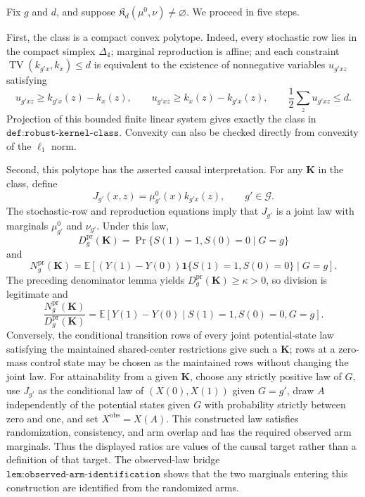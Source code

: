 Fix \(g\) and \(d\), and suppose \(\mathfrak K_d(\mu^0,\nu)\ne\varnothing\).  We proceed in five steps.

First, the class is a compact convex polytope.  Indeed, every stochastic row lies in the compact simplex \(\Delta_4\); marginal reproduction is affine; and each constraint
\(\operatorname{TV}(k_{g'x},k_x)\le d\) is equivalent to the existence of nonnegative variables \(u_{g'xz}\) satisfying
\[
 u_{g'xz}\ge k_{g'x}(z)-k_x(z),\qquad
 u_{g'xz}\ge k_x(z)-k_{g'x}(z),\qquad
 \frac12\sum_z u_{g'xz}\le d.
\]
Projection of this bounded finite linear system gives exactly the class in \(\texttt{def:robust-kernel-class}\).  Convexity can also be checked directly from convexity of the \(\ell_1\) norm.

Second, this polytope has the asserted causal interpretation.  For any \(\mathbf K\) in the class, define
\[
 J_{g'}(x,z)=\mu_{g'}^0(x)k_{g'x}(z),\qquad g'\in\mathcal G.
\]
The stochastic-row and reproduction equations imply that \(J_{g'}\) is a joint law with marginals \(\mu_{g'}^0\) and \(\nu_{g'}\).  Under this law,
\[
 D_g^{\mathrm{pr}}(\mathbf K)
 =\Pr\{S(1)=1,S(0)=0\mid G=g\}
\]
and
\[
 N_g^{\mathrm{pr}}(\mathbf K)
 =\mathbb E[(Y(1)-Y(0))\mathbf 1\{S(1)=1,S(0)=0\}\mid G=g].
\]
The preceding denominator lemma yields \(D_g^{\mathrm{pr}}(\mathbf K)\ge\kappa>0\), so division is legitimate and
\[
 \frac{N_g^{\mathrm{pr}}(\mathbf K)}{D_g^{\mathrm{pr}}(\mathbf K)}
 =\mathbb E[Y(1)-Y(0)\mid S(1)=1,S(0)=0,G=g].
\]
Conversely, the conditional transition rows of every joint potential-state law satisfying the maintained shared-center restrictions give such a \(\mathbf K\); rows at a zero-mass control state may be chosen as the maintained rows without changing the joint law.  For attainability from a given \(\mathbf K\), choose any strictly positive law of \(G\), use \(J_{g'}\) as the conditional law of \((X(0),X(1))\) given \(G=g'\), draw \(A\) independently of the potential states given \(G\) with probability strictly between zero and one, and set \(X^{\mathrm{obs}}=X(A)\).  This constructed law satisfies randomization, consistency, and arm overlap and has the required observed arm marginals.  Thus the displayed ratios are values of the causal target rather than a definition of that target.  The observed-law bridge \(\texttt{lem:observed-arm-identification}\) shows that the two marginals entering this construction are identified from the randomized arms.

